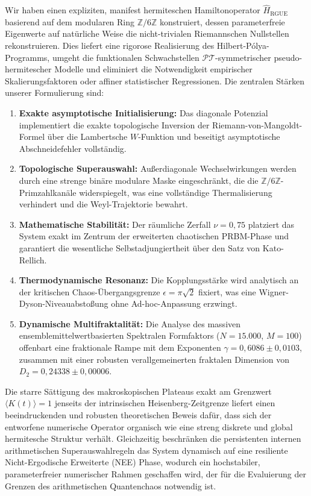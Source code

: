 \documentclass[aps,prl,preprint,superscriptaddress,floatfix]{revtex4-2}
\newcommand{\Zmod}{\mathbb{Z}/6\mathbb{Z}}
\begin{document}
Wir haben einen expliziten, manifest hermiteschen Hamiltonoperator $\hat{H}_{\text{RGUE}}$ basierend auf dem modularen Ring $\mathbb{Z}/6\mathbb{Z}$ konstruiert, dessen parameterfreie Eigenwerte auf natürliche Weise die nicht-trivialen Riemannschen Nullstellen rekonstruieren.
Dies liefert eine rigorose Realisierung des Hilbert-Pólya-Programms, umgeht die funktionalen Schwachstellen $\mathcal{PT}$-symmetrischer pseudo-hermitescher Modelle und eliminiert die Notwendigkeit empirischer Skalierungsfaktoren oder affiner statistischer Regressionen.
Die zentralen Stärken unserer Formulierung sind:
\begin{enumerate}
    \item \textbf{Exakte asymptotische Initialisierung:} Das diagonale Potenzial implementiert die exakte topologische Inversion der Riemann-von-Mangoldt-Formel über die Lambertsche $W$-Funktion und beseitigt asymptotische Abschneidefehler vollständig.
    \item \textbf{Topologische Superauswahl:} Außerdiagonale Wechselwirkungen werden durch eine strenge binäre modulare Maske eingeschränkt, die die $\Zmod$-Primzahlkanäle widerspiegelt, was eine vollständige Thermalisierung verhindert und die Weyl-Trajektorie bewahrt.
    \item \textbf{Mathematische Stabilität:} Der räumliche Zerfall $\nu = 0,75$ platziert das System exakt im Zentrum der erweiterten chaotischen PRBM-Phase und garantiert die wesentliche Selbstadjungiertheit über den Satz von Kato-Rellich.
    \item \textbf{Thermodynamische Resonanz:} Die Kopplungsstärke wird analytisch an der kritischen Chaos-Übergangsgrenze $\epsilon = \pi \sqrt{2}$ fixiert, was eine Wigner-Dyson-Niveauabstoßung ohne Ad-hoc-Anpassung erzwingt.
    \item \textbf{Dynamische Multifraktalität:} Die Analyse des massiven ensemblemittelwertbasierten Spektralen Formfaktors ($N=15.000$, $M=100$) offenbart eine fraktionale Rampe mit dem Exponenten $\gamma = 0,6086 \pm 0,0103$, zusammen mit einer robusten verallgemeinerten fraktalen Dimension von $D_2 = 0,24338 \pm 0,00006$.
\end{enumerate}

Die starre Sättigung des makroskopischen Plateaus exakt am Grenzwert $\langle K(t) \rangle = 1$ jenseits der intrinsischen Heisenberg-Zeitgrenze liefert einen beeindruckenden und robusten theoretischen Beweis dafür, dass sich der entworfene numerische Operator organisch wie eine streng diskrete und global hermitesche Struktur verhält. Gleichzeitig beschränken die persistenten internen arithmetischen Superauswahlregeln das System dynamisch auf eine resiliente Nicht-Ergodische Erweiterte (NEE) Phase, wodurch ein hochstabiler, parameterfreier numerischer Rahmen geschaffen wird, der für die Evaluierung der Grenzen des arithmetischen Quantenchaos notwendig ist.
\end{document}
